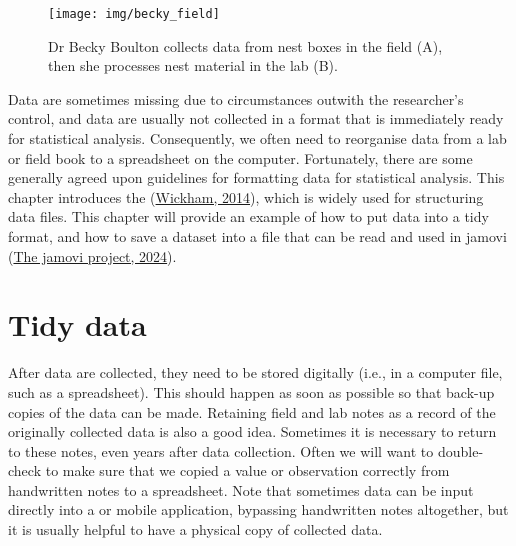 \documentclass[
  openany]{krantz}
\begin{document}
\begin{figure}
\texttt{[image: img/becky\_field]} \caption{Dr Becky Boulton collects data from nest boxes in the field (A), then she processes nest material in the lab (B).}\label{fig:unnamed-chunk-4}
\end{figure}

Data are sometimes missing due to circumstances outwith the researcher's control, and data are usually not collected in a format that is immediately ready for statistical analysis.
Consequently, we often need to reorganise data from a lab or field book to a spreadsheet on the computer.
Fortunately, there are some generally agreed upon guidelines for formatting data for statistical analysis.
This chapter introduces the  (\protect\hyperlink{ref-Wickham2014}{Wickham, 2014}), which is widely used for structuring data files.
This chapter will provide an example of how to put data into a tidy format, and how to save a dataset into a file that can be read and used in jamovi (\protect\hyperlink{ref-Jamovi2022}{The jamovi project, 2024}).

\hypertarget{tidy-data}{%
\section{Tidy data}\label{tidy-data}}

After data are collected, they need to be stored digitally (i.e., in a computer file, such as a spreadsheet).
This should happen as soon as possible so that back-up copies of the data can be made.
Retaining field and lab notes as a record of the originally collected data is also a good idea.
Sometimes it is necessary to return to these notes, even years after data collection.
Often we will want to double-check to make sure that we copied a value or observation correctly from handwritten notes to a spreadsheet.
Note that sometimes data can be input directly into a  or mobile application, bypassing handwritten notes altogether, but it is usually helpful to have a physical copy of collected data.
\end{document}
